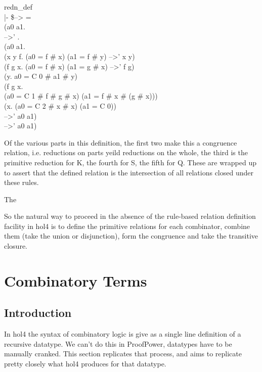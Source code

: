 \begin{GFT}{}
\+    redn\_def\\
\+    |- \$--> =\\
\+       (\MMM{\lambda}a0 a1.\\
\+          \MMM{\forall}-->' .\\
\+            (\MMM{\forall}a0 a1.\\
\+               (\MMM{\exists}x y f. (a0 = f \# x) \MMM{\land} (a1 = f \# y) \MMM{\land} -->' x y) \MMM{\lor}\\
\+               (\MMM{\exists}f g x. (a0 = f \# x) \MMM{\land} (a1 = g \# x) \MMM{\land} -->' f g) \MMM{\lor}\\
\+               (\MMM{\exists}y. a0 = C 0 \# a1 \# y) \MMM{\lor}\\
\+               (\MMM{\exists}f g x.\\
\+                  (a0 = C 1 \# f \# g \# x) \MMM{\land} (a1 = f \# x \# (g \# x))) \MMM{\lor}\\
\+               (\MMM{\exists}x. (a0 = C 2 \# x \# x) \MMM{\land} (a1 = C 0)) \MMM{\Rightarrow}\\
\+               -->' a0 a1) \MMM{\Rightarrow}\\
\+            -->' a0 a1)\\
\end{GFT}

Of the various parts in this definition, the first two make this a congruence relation, i.e. reductions on parts yeild reductions on the whole, the third is the primitive reduction for K, the fourth for S, the fifth for Q.
These are wrapped up to assert that the defined relation is the intersection of all relations closed under these rules.

The


So the natural way to proceed in the absence of the rule-based relation definition facility in hol4 is to define the primitive relations for each combinator, combine them (take the union or disjunction), form the congruence and take the transitive closure.


\section{Combinatory Terms}

\subsection{Introduction}

In hol4 the syntax of combinatory logic is give as a single line definition of a recursive datatype.
We can't do this in ProofPower, datatypes have to be manually cranked.
This section replicates that process, and aims to replicate pretty closely what hol4 produces for that datatype.

